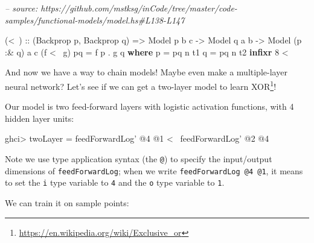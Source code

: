 \documentclass[]{article}
\newenvironment{Shaded}{}{}
\newcommand{\CommentTok}[1]{\textcolor[rgb]{0.38,0.63,0.69}{\textit{#1}}}
\newcommand{\DataTypeTok}[1]{\textcolor[rgb]{0.56,0.13,0.00}{#1}}
\newcommand{\DecValTok}[1]{\textcolor[rgb]{0.25,0.63,0.44}{#1}}
\newcommand{\FunctionTok}[1]{\textcolor[rgb]{0.02,0.16,0.49}{#1}}
\newcommand{\KeywordTok}[1]{\textcolor[rgb]{0.00,0.44,0.13}{\textbf{#1}}}
\newcommand{\NormalTok}[1]{#1}
\newcommand{\OtherTok}[1]{\textcolor[rgb]{0.00,0.44,0.13}{#1}}
\renewcommand{\href}[2]{#2\footnote{\url{#1}}}
\begin{document}
\begin{Shaded}
\begin{Highlighting}[]
\CommentTok{-- source: https://github.com/mstksg/inCode/tree/master/code-samples/functional-models/model.hs#L138-L147}

\NormalTok{(}\FunctionTok{<~}\NormalTok{)}
\OtherTok{    ::}\NormalTok{ (}\DataTypeTok{Backprop}\NormalTok{ p, }\DataTypeTok{Backprop}\NormalTok{ q)}
    \OtherTok{=>} \DataTypeTok{Model}\NormalTok{  p       b c}
    \OtherTok{->} \DataTypeTok{Model}\NormalTok{       q  a b}
    \OtherTok{->} \DataTypeTok{Model}\NormalTok{ (p }\FunctionTok{:&}\NormalTok{ q) a c}
\NormalTok{(f }\FunctionTok{<~}\NormalTok{ g) pq }\FunctionTok{=}\NormalTok{ f p }\FunctionTok{.}\NormalTok{ g q}
  \KeywordTok{where}
\NormalTok{    p }\FunctionTok{=}\NormalTok{ pq }\FunctionTok{^^.}\NormalTok{ t1}
\NormalTok{    q }\FunctionTok{=}\NormalTok{ pq }\FunctionTok{^^.}\NormalTok{ t2}
\KeywordTok{infixr} \DecValTok{8} \FunctionTok{<~}
\end{Highlighting}
\end{Shaded}

And now we have a way to chain models! Maybe even make a multiple-layer neural
network? Let's see if we can get a two-layer model to learn
\href{https://en.wikipedia.org/wiki/Exclusive_or}{XOR}!

Our model is two feed-forward layers with logistic activation functions, with 4
hidden layer units:

\begin{Shaded}
\begin{Highlighting}[]
\NormalTok{ghci}\FunctionTok{>}\NormalTok{ twoLayer }\FunctionTok{=}\NormalTok{ feedForwardLog' }\FunctionTok{@}\DecValTok{4} \FunctionTok{@}\DecValTok{1} \FunctionTok{<~}\NormalTok{ feedForwardLog' }\FunctionTok{@}\DecValTok{2} \FunctionTok{@}\DecValTok{4}
\end{Highlighting}
\end{Shaded}

Note we use type application syntax (the \texttt{@}) to specify the input/output
dimensions of \texttt{feedForwardLog\textquotesingle{}}; when we write
\texttt{feedForwardLog\textquotesingle{}\ @4\ @1}, it means to set the
\texttt{i} type variable to \texttt{4} and the \texttt{o} type variable to
\texttt{1}.

We can train it on sample points:

\begin{Shaded}
\end{Shaded}
\end{document}
